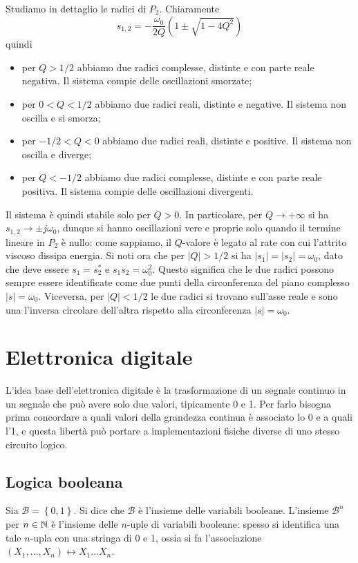 \documentclass[a4paper, 11pt]{article}
\newcommand{\B}{\mathcal{B}}
\begin{document}
Studiamo in dettaglio le radici di $P_2$. Chiaramente
\[s_{1,2}=-\frac{\omega_0}{2Q}\left(1\pm\sqrt{1-4Q^2}\right)\]
quindi
\begin{itemize}
	\item per $Q>1/2$ abbiamo due radici complesse, distinte e con parte reale negativa. Il sistema compie delle oscillazioni smorzate;
	\item per $0<Q<1/2$ abbiamo due radici reali, distinte e negative. Il sistema non oscilla e si smorza;
	\item per $-1/2<Q<0$ abbiamo due radici reali, distinte e positive. Il sistema non oscilla e diverge;
	\item per $Q<-1/2$ abbiamo due radici complesse, distinte e con parte reale positiva. Il sistema compie delle oscillazioni divergenti.
\end{itemize}
Il sistema è quindi stabile solo per $Q>0$. In particolare, per $Q\to+\infty$ si ha $s_{1,2}\to\pm j\omega_0$, dunque si hanno oscillazioni vere e proprie solo quando il termine lineare in $P_2$ è nullo: come sappiamo, il $Q$-valore è legato al rate con cui l'attrito viscoso dissipa energia. Si noti ora che per $|Q|>1/2$ si ha $|s_{1}|=|s_2|=\omega_0$, dato che deve essere $s_1=s_2^*$ e $s_1s_2=\omega_0^2$. Questo significa che le due radici possono sempre essere identificate come due punti della circonferenza del piano complesso $|s|=\omega_0$. Viceversa, per $|Q|<1/2$ le due radici si trovano sull'asse reale e sono una l'inversa circolare dell'altra rispetto alla circonferenza $|s|=\omega_0$.
\newpage
\section{Elettronica digitale}
L'idea base dell'elettronica digitale è la trasformazione di un segnale continuo in un segnale che può avere solo due valori, tipicamente 0 e 1. Per farlo bisogna prima concordare a quali valori della grandezza continua è associato lo 0 e a quali l'1, e questa libertà può portare a implementazioni fisiche diverse di uno stesso circuito logico.
\subsection{Logica booleana}
Sia $\B=\left\{0,1\right\}$. Si dice che $\B$ è l'insieme delle variabili booleane. L'insieme $\B^n$ per $n\in\mathbb{N}$ è l'insieme delle $n$-uple di variabili booleane: spesso si identifica una tale $n$-upla con una stringa di 0 e 1, ossia si fa l'associazione $(X_1,\dots, X_n)\leftrightarrow X_1\dots X_n$.
\end{document}
